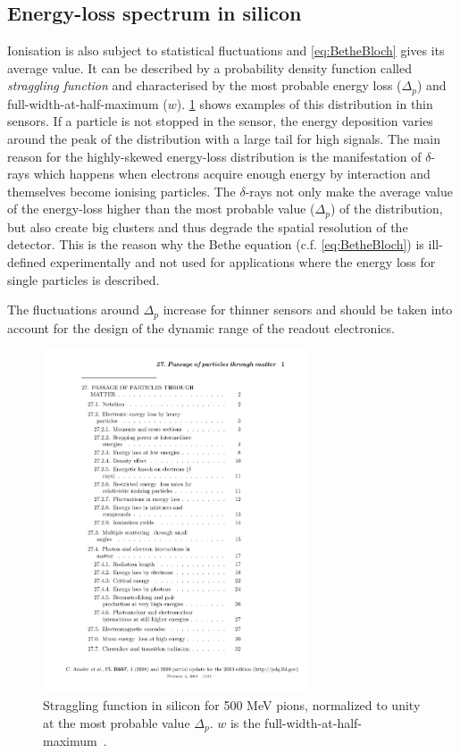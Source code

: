 \subsection{Energy-loss spectrum in silicon}
\label{sec:SiliconEnergyLossSpectrum}
Ionisation is also subject to statistical fluctuations and
\cref{eq:BetheBloch} gives its average value. It can be described by a
probability density function called \textit{straggling function} and
characterised by the most probable energy loss ($\Delta_{p}$) and
full-width-at-half-maximum ($w$). \cref{fig:LandauDistribution} shows
examples of this distribution in thin sensors. If a particle is not
stopped in the sensor, the energy deposition varies around the peak of
the distribution with a large tail for high signals. The main reason
for the highly-skewed energy-loss distribution is the manifestation of
$\delta$-rays which happens when electrons acquire enough energy by
interaction and themselves become ionising particles. The
$\delta$-rays not only make the average value of the energy-loss
higher than the most probable value ($\Delta_{p}$) of the
distribution, but also create big clusters and thus degrade the
spatial resolution of the detector. This is the reason why the Bethe
equation (c.f. \cref{eq:BetheBloch}) is ill-defined experimentally and
not used for applications where the energy loss for single particles
is described.

The fluctuations around $\Delta_{p}$ increase for thinner sensors and
should be taken into account for the design of the dynamic range of
the readout electronics.


\begin{figure}[htbp]
  \centering
  \includegraphics[width=0.7\textwidth, page=14, trim = 50mm 160mm
    40mm 20mm, clip]{Articles/rpp2009-rev-passage-particles-matter.pdf}
  \caption{Straggling function in silicon for 500 MeV pions,
    normalized to unity at the most probable value $\Delta_{p}$. $w$
    is the full-width-at-half-maximum~\cite{Beringer:1900zz}.}
  \label{fig:LandauDistribution}
\end{figure}

